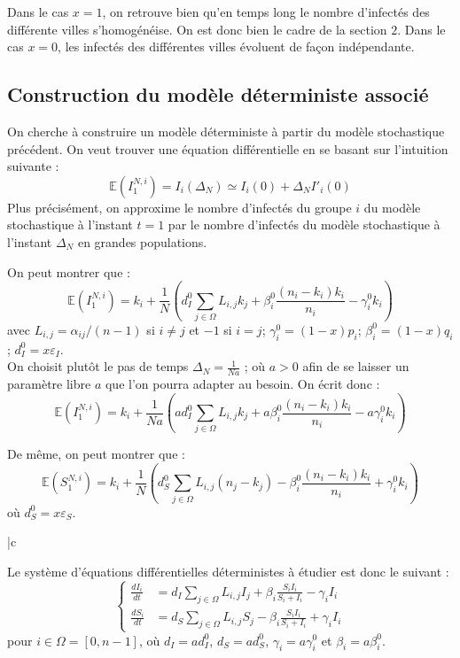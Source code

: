 \documentclass[a4paper,10.9pt]{article}
\newcommand{\E}{\mathbb{E}}
\begin{document}
Dans le cas $x=1$, on retrouve bien qu'en temps long le nombre d'infectés des différente villes s'homogénéise. On est donc bien le cadre de la section $2$. Dans le cas $x=0$, les infectés des différentes villes évoluent de façon indépendante.

\subsection{Construction du modèle déterministe associé}

On cherche à construire un modèle déterministe à partir du modèle stochastique précédent. On veut trouver une équation différentielle en se basant sur l'intuition suivante :
$$\mathbb{E}(I^{N,i}_1) = I_i(\Delta_N) \simeq I_i(0)+\Delta_N I'_i(0)$$
Plus précisément, on approxime le nombre d'infectés du groupe $i$ du modèle stochastique à l'instant $t=1$ par le nombre d'infectés du modèle stochastique à l'instant $\Delta_N$ en grandes populations.

On peut montrer que :
$$\E(I^{N,i}_1)=k_i+\frac{1}{N} \left( d_I^0 \sum_{j \in \Omega} L_{i,j} k_j + \beta_i^0 \frac{(n_i-k_i) k_i}{n_i}-\gamma_i^0 k_i \right)$$
avec $L_{i,j}=\alpha_{ij}/(n-1)$ si $i \neq j$ et $-1$ si $i=j$; $\gamma_i^0=(1-x)p_i$; $\beta_i^0=(1-x)q_i$; $d_I^0=x\varepsilon_I$. \\

On choisit plutôt le pas de temps $\Delta_N = \frac{1}{Na}$ ; où $a >0$ afin de se laisser un paramètre libre $a$ que l'on pourra adapter au besoin. On écrit donc :
$$\E(I^{N,i}_1)=k_i+\frac{1}{Na} \left( ad_I^0 \sum_{j \in \Omega} L_{i,j} k_j + a\beta_i^0 \frac{(n_i-k_i) k_i}{n_i}-a\gamma_i^0 k_i \right)$$

De même, on peut montrer que  :
$$\E(S^{N,i}_1)=k_i+\frac{1}{N} \left(d_S^0 \sum_{j \in \Omega} L_{i,j} ( n_j-k_j) - \beta_i^0 \frac{(n_i-k_i) k_i}{n_i}+\gamma_i^0 k_i \right)$$
où $d_S^0 = x\varepsilon_S$. \\

\begin{tabular}{|c}
\begin{minipage}{\textwidth}
Le système d'équations différentielles déterministes à étudier est donc le suivant :
\[
\left\{
\begin{aligned}
\frac{dI_i}{dt} &= d_I \sum_{j \in \Omega} L_{i,j} I_j + \beta_i\frac{S_i I_i}{S_i+I_i} - \gamma_i I_i \\
\frac{dS_i}{dt} &= d_S \sum_{j \in \Omega} L_{i,j} S_j - \beta_i\frac{S_i I_i}{S_i+I_i} + \gamma_i I_i
\end{aligned}
\right.
\]
pour $i \in \Omega = [0,n-1]$, où $d_I=ad_I^0$, $d_S=a d_S^0$, $\gamma_i=a\gamma_i^0$ et $\beta_i=a\beta_i^0$.
\end{minipage}
\end{tabular} \\
\end{document}
